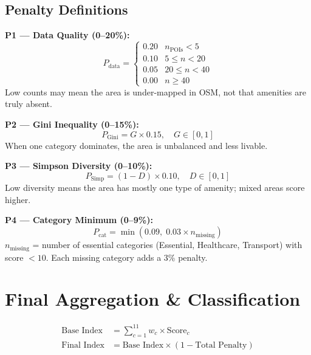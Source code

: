 \documentclass[11pt,a4paper]{article}
\begin{document}
\subsection{Penalty Definitions}

\textbf{P1 --- Data Quality (0--20\%):}
\begin{equation}
P_{\text{data}} = \begin{cases}
0.20 & n_{\text{POIs}} < 5 \\
0.10 & 5  \le n < 20 \\
0.05 & 20 \le n < 40 \\
0.00 & n \ge 40
\end{cases}
\end{equation}
Low counts may mean the area is under-mapped in OSM, not that amenities are truly absent.

\medskip
\textbf{P2 --- Gini Inequality (0--15\%):}
\begin{equation}
P_{\text{Gini}} = G \times 0.15, \quad G \in [0,1]
\end{equation}
When one category dominates, the area is unbalanced and less livable.

\medskip
\textbf{P3 --- Simpson Diversity (0--10\%):}
\begin{equation}
P_{\text{Simp}} = (1 - D)\times 0.10, \quad D \in [0,1]
\end{equation}
Low diversity means the area has mostly one type of amenity; mixed areas score higher.

\medskip
\textbf{P4 --- Category Minimum (0--9\%):}
\begin{equation}
P_{\text{cat}} = \min(0.09,\;0.03\times n_{\text{missing}})
\end{equation}
$n_{\text{missing}}$ = number of essential categories (Essential, Healthcare, Transport) with score $<10$. Each missing category adds a 3\% penalty.

\section{Final Aggregation \& Classification}

\begin{align}
\text{Base Index}  &= \sum_{c=1}^{11} w_c \times \text{Score}_c \\[4pt]
\text{Final Index} &= \text{Base Index}\times(1 - \text{Total Penalty})
\end{align}
\end{document}
